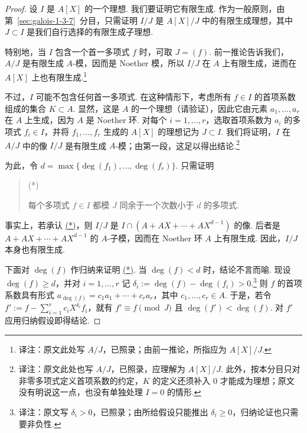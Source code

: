 \begin{proof}
设 $I$ 是 $A[X]$ 的一个理想. 我们要证明它有限生成. 作为一般原则，由第~\ref{sec:galois-1-3-7}~分目，只需证明 $I/J$ 是 $A[X]/J$ 中的有限生成理想，其中 $J\subset I$ 是我们自行选择的有限生成子理想.

特别地，当 $I$ 包含一个首一多项式 $f$ 时，可取 $J=(f)$. 前一推论告诉我们，$A/J$ 是有限生成 $A$-模，因而是 Noether 模，所以 $I/J$ 在 $A$ 上有限生成，进而在 $A[X]$ 上也有限生成.\footnote{译注：原文此处写 $A/J$，已照录；由前一推论，所指应为 $A[X]/J$.}

不过，$I$ 可能不包含任何首一多项式. 在这种情形下，考虑所有 $f\in I$ 的首项系数组成的集合 $K\subset A$. 显然，这是 $A$ 的一个理想（请验证），因此它由元素 $a_1,\ldots,a_r$ 在 $A$ 上生成，因为 $A$ 是 Noether 环. 对每个 $i=1,\ldots,r$，选取首项系数为 $a_i$ 的多项式 $f_i\in I$，并将 $f_1,\ldots,f_r$ 生成的 $A[X]$ 的理想记为 $J\subset I$. 我们将证明，$I$ 在 $A/J$ 中的像 $I/J$ 是有限生成 $A$-模；由第一段，这足以得出结论.\footnote{译注：原文此处也写 $A/J$，已照录，应理解为 $A[X]/J$. 此外，按本分目只对非零多项式定义首项系数的约定，$K$ 的定义还须补入 $0$ 才能成为理想；原文没有明说这一点，也没有单独处理 $I=0$ 的情形.}

为此，令 $d=\max\{\deg(f_1),\ldots,\deg(f_r)\}$. 只需证明
\begin{quote}
\hypertarget{galois-hilbert-star}{(*)} 每个多项式 $f\in I$ 都模 $J$ 同余于一个次数小于 $d$ 的多项式.
\end{quote}
事实上，若承认 \hyperlink{galois-hilbert-star}{(*)}，则 $I/J$ 是 $I\cap(A+AX+\cdots+AX^{d-1})$ 的像. 后者是 $A+AX+\cdots+AX^{d-1}$ 的 $A$-子模，因而在 Noether 环 $A$ 上有限生成. 因此，$I/J$ 本身也有限生成.

下面对 $\deg(f)$ 作归纳来证明 \hyperlink{galois-hilbert-star}{(*)}. 当 $\deg(f)<d$ 时，结论不言而喻. 现设 $\deg(f)\geq d$，并对 $i=1,\ldots,r$ 记 $\delta_i:=\deg(f)-\deg(f_i)>0$.\footnote{译注：原文写 $\delta_i>0$，已照录；由所给假设只能推出 $\delta_i\geq0$，归纳论证也只需要非负性.} 则 $f$ 的首项系数具有形式 $a_{\deg(f)}=c_1a_1+\cdots+c_ra_r$，其中 $c_1,\ldots,c_r\in A$. 于是，若令 $f':=f-\sum_{i=1}^r c_iX^{\delta_i}f_i$，就有 $f'\equiv f\pmod J$ 且 $\deg(f')<\deg(f)$. 对 $f'$ 应用归纳假设即得结论.
\end{proof}


